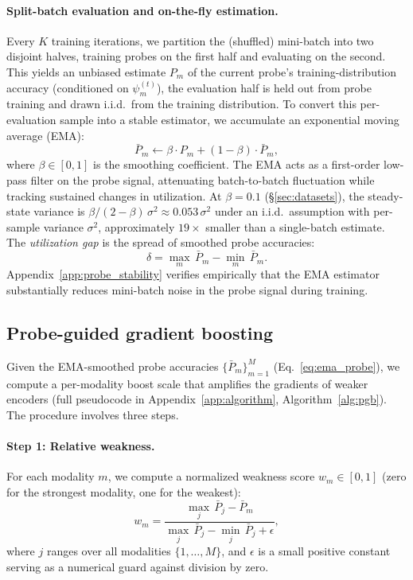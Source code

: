 \documentclass{article}
\begin{document}
\paragraph{Split-batch evaluation and on-the-fly estimation.}
Every $K$ training iterations, we partition the (shuffled) mini-batch into two disjoint halves, training probes on the first half and evaluating on the second. This yields an unbiased estimate $P_m$ of the current probe's training-distribution accuracy (conditioned on $\psi_m^{(t)}$), the evaluation half is held out from probe training and drawn i.i.d.\ from the training distribution. To convert this per-evaluation sample into a stable estimator, we accumulate an exponential moving average (EMA):
%
\begin{equation}
\label{eq:ema_probe}
\bar{P}_m \leftarrow \beta \cdot P_m + (1 - \beta) \cdot \bar{P}_m,
\end{equation}
%
where $\beta \in [0,1]$ is the smoothing coefficient. The EMA acts as a first-order low-pass filter on the probe signal, attenuating batch-to-batch fluctuation while tracking sustained changes in utilization. At $\beta = 0.1$ (\S\ref{sec:datasets}), the steady-state variance is $\beta/(2-\beta)\,\sigma^{2} \approx 0.053\,\sigma^{2}$ under an i.i.d.\ assumption with per-sample variance $\sigma^{2}$, approximately $19\times$ smaller than a single-batch estimate. The \emph{utilization gap} is the spread of smoothed probe accuracies:
%
\begin{equation}
\label{eq:utilization_gap}
\delta = \max_{m}\,\bar{P}_m - \min_{m}\,\bar{P}_m.
\end{equation}
%
Appendix~\ref{app:probe_stability} verifies empirically that the EMA estimator substantially reduces mini-batch noise in the probe signal during training.


\subsection{Probe-guided gradient boosting}
\label{sec:boost}

Given the EMA-smoothed probe accuracies $\{\bar{P}_m\}_{m=1}^{M}$ (Eq.~\eqref{eq:ema_probe}), we compute a per-modality boost scale that amplifies the gradients of weaker encoders (full pseudocode in Appendix~\ref{app:algorithm}, Algorithm~\ref{alg:pgb}). The procedure involves three steps.

\paragraph{Step 1: Relative weakness.}
For each modality $m$, we compute a normalized weakness score $w_m \in [0,1]$ (zero for the strongest modality, one for the weakest):
%
\begin{equation}
\label{eq:weakness}
w_m = \frac{\max_j\,\bar{P}_j - \bar{P}_m}{\max_j\,\bar{P}_j - \min_j\,\bar{P}_j + \epsilon},
\end{equation}
%
where $j$ ranges over all modalities $\{1, \ldots, M\}$, and $\epsilon$ is a small positive constant serving as a numerical guard against division by zero.
\end{document}
